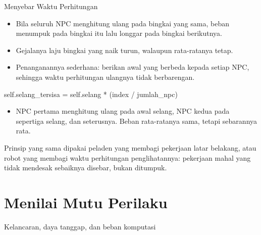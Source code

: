 \documentclass[aspectratio=169,10pt]{beamer}
\begin{document}
\begin{frame}{Menyebar Waktu Perhitungan}
\begin{itemize}
  \item Bila seluruh NPC menghitung ulang pada bingkai yang sama, beban
        menumpuk pada bingkai itu lalu longgar pada bingkai berikutnya.
  \item Gejalanya laju bingkai yang naik turun, walaupun rata-ratanya tetap.
  \item Penanganannya sederhana: berikan awal yang berbeda kepada setiap NPC,
        sehingga waktu perhitungan ulangnya tidak berbarengan.
\end{itemize}
\begin{center}
{\ttfamily\small self.selang\_tersisa = self.selang * (index / jumlah\_npc)}
\end{center}
\begin{itemize}
  \item NPC pertama menghitung ulang pada awal selang, NPC kedua pada sepertiga
        selang, dan seterusnya. Beban rata-ratanya sama, tetapi sebarannya rata.
\end{itemize}
\begin{kiat}
Prinsip yang sama dipakai peladen yang membagi pekerjaan latar belakang, atau
robot yang membagi waktu perhitungan penglihatannya: pekerjaan mahal yang tidak
mendesak sebaiknya disebar, bukan ditumpuk.
\end{kiat}
\end{frame}

\section{Menilai Mutu Perilaku}
  {Kelancaran, daya tanggap, dan beban komputasi}
\end{document}
